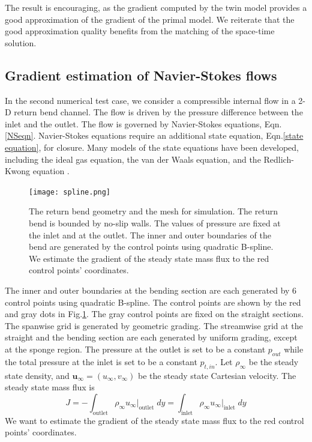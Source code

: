 \documentclass{paper1}
\begin{document}
The result is encouraging, as the gradient computed by the twin model provides
a good approximation
of the gradient of the primal model. We reiterate that the good approximation quality benefits from 
the matching of the space-time solution.

\clearpage
\subsection{Gradient estimation of Navier-Stokes flows}
In the second numerical test case, we consider
a compressible internal flow in a 2-D return bend channel.
The flow is driven by the pressure difference between the inlet and the outlet.
The flow is governed by Navier-Stokes equations, Eqn.\eqref{NSeqn}.
Navier-Stokes equations require an additional state equation, Eqn.\eqref{state equation}, for closure.
Many models of the state equations have been developed, including the ideal gas equation, the
van der Waals equation, and the Redlich-Kwong equation \cite{state eqns}.\\

\begin{figure}\begin{center}
    \texttt{[image: spline.png]}
    \caption{The return bend geometry and the mesh for simulation. The return bend is bounded by 
    no-slip walls. The values of pressure
    are fixed at the inlet and at the outlet. 
    The inner and outer boundaries of the bend are generated by the control points
    using quadratic B-spline.
    We estimate the gradient of the steady state mass flux
    to the red control points' coordinates.}
    \label{NS mesh}
\end{center}\end{figure}

The inner and outer boundaries at the bending section 
are each generated by 6 control points using quadratic B-spline. 
The control points are shown by the red and gray dots in Fig.\ref{NS mesh}.
The gray control points are fixed 
on the straight sections.
The spanwise grid is generated by geometric grading. The streamwise
grid at the straight and the bending section are each generated
by uniform grading, except at the sponge region.
The pressure at the outlet is set to be a constant $p_{out}$ while
the total pressure at the inlet is set to be a constant $p_{t,in}$.
Let $\rho_\infty$ be the steady state density, and
$\boldsymbol{u}_\infty = (u_\infty, v_\infty)$ be the steady state Cartesian velocity.
The steady state mass flux is
\begin{equation}
    J = - \int_{\textrm{outlet}} \rho_\infty u_\infty \big|_{\textrm{outlet}} \; dy=
    \int_{\textrm{inlet}} \rho_\infty u_\infty\big|_{\textrm{inlet}} \; dy
    \label{mass flux}
\end{equation}
We want to estimate the gradient of the steady state mass flux
to the red control points' coordinates.
\\
\end{document}
